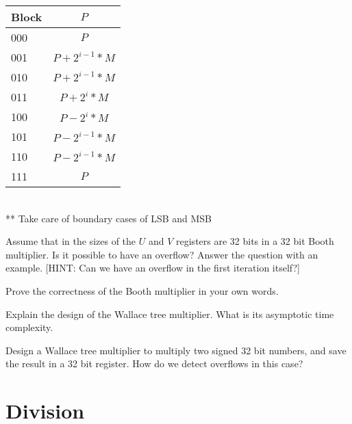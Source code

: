 \begin{ExerciseList}
\begin{tabular}{|l|c|}
\hline
Block & $P$ \\
\hline \hline
000 &	$P$ \\
\hline
001	& $P + 2^{i-1} * M$ \\
\hline
010	& $P + 2^{i-1} * M$ \\
\hline
011	& $P + 2^{i} * M$ \\
\hline
100	& $P - 2^{i} * M$ \\
\hline
101	& $P -2^{i-1} * M$\\
\hline
110	& $P -2^{i-1} * M$ \\
\hline
111	& $P$ \\
\hline
\end{tabular} \\

** Take care of boundary cases of LSB and MSB

\Exercise[difficulty=1]
Assume that in the sizes of the $U$ and $V$ registers are 32 bits in a 32 bit Booth multiplier. Is it possible to have an
overflow? Answer the question with an example. [HINT: Can we have an overflow in the first iteration itself?]

\Exercise[difficulty=1]
Prove the correctness of the Booth multiplier in your own words.

\Exercise
Explain the design of the Wallace tree multiplier. What is its asymptotic time complexity.

\Exercise[difficulty=2] Design a Wallace tree multiplier to multiply two signed 32 bit numbers, and save the result in a 32 bit
register. How do we detect overflows in this case?


\end{ExerciseList}

\section*{Division}

